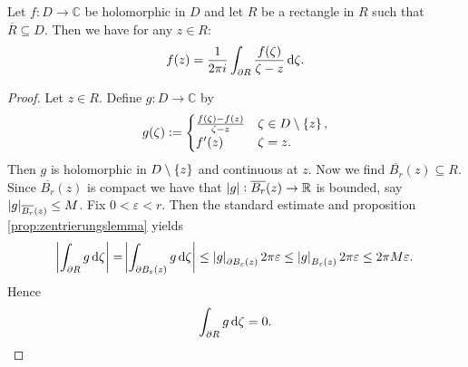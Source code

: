 \begin{enumerate}[label = \textbf{Exercise \arabic*.},wide = 0pt, itemsep=1.5ex]
		\begin{theorem}
			Let $f: D \to \mathbb{C}$ be holomorphic in $D$ and let $R$ be a rectangle in $R$ such that $\overline{R} \subseteq D$. Then we have for any $z \in R$:
			\begin{equation}
				f(z) = \frac{1}{2\pi i}\int_{\partial R}\frac{f(\zeta)}{\zeta - z} \mathop{}\!\mathrm{d} \zeta.
			\end{equation}
		\end{theorem}

		\begin{proof}
			Let $z \in R$. Define $g: D \to \mathbb{C}$ by  
			\begin{align}
				g(\zeta) := \begin{cases}
					\frac{f(\zeta) - f(z)}{\zeta - z} & \zeta \in D \setminus \cbr[0]{z},\\
					f'(z) & \zeta = z.
				\end{cases}
			\end{align}
			Then $g$ is holomorphic in $D\setminus \cbr[0]{z}$ and continuous at $z$. Now we find $\overline{B_r}(z) \subseteq R$. Since $\overline{B_r}(z)$ is compact we have that $\abs[0]{g} : \overline{B_r}(z) \to \mathbb{R}$ is bounded, say $\abs[0]{g}_{\overline{B_r}(z)} \leq M$. Fix $0 < \varepsilon < r$. Then the standard estimate and proposition \ref{prop:zentrierungslemma} yields
			\begin{equation}
				\abs[3]{\int_{\partial R}g \d \zeta} = \abs[3]{\int_{\partial B_\varepsilon(z)} g \d \zeta} \leq \abs[0]{g}_{\partial B_\varepsilon(z)}2\pi\varepsilon \leq \abs[0]{g}_{B_\varepsilon(z)}2\pi\varepsilon \leq 2\pi M \varepsilon.
			\end{equation}
			Hence 
			\begin{equation}
				\int_{\partial R}g \mathop{}\!\mathrm{d} \zeta = 0.
				\label{eq:intg0}
			\end{equation}


\end{proof}
\end{enumerate}

